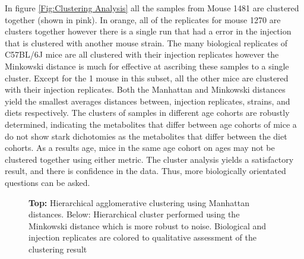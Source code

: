\documentclass[a4paper,11pt,twoside]{book}
\begin{document}
	In figure \ref{Fig:Clustering Analysis} all the samples from Mouse 1481 are clustered together (shown in pink). In orange, all of the replicates for mouse 1270 are clusters together however there is a single run that had a error in the injection that is clustered with another mouse strain.  The many biological replicates of C57BL/6J mice are all clustered with their injection replicates however the Minkowski distance is much for effective at ascribing these samples to a single cluster. Except for the 1 mouse in this subset, all the other mice are clustered with their injection replicates. Both the Manhattan and Minkowski distances yield the smallest averages distances between, injection replicates, strains, and diets respectively. The clusters of samples in different age cohorts are robustly determined, indicating the metabolites that differ between age cohorts of mice a do not show stark dichotomies as the metabolites that differ between the diet cohorts. As a results age, mice in the same age cohort on ages may not be clustered together using either metric. The cluster analysis yields a satisfactory result, and there is confidence in the data. Thus, more biologically orientated questions can be asked. 
	
	\begin{figure}[hbt!]
		\caption{ \textbf{Top:} Hierarchical agglomerative clustering using Manhattan distances. Below: Hierarchical cluster performed using the Minkowski distance which is more robust to noise. Biological and injection replicates are colored to qualitative assessment of the clustering result}
		\label{fig:Clustering Analysis}
	\end{figure}
	
\end{document}

